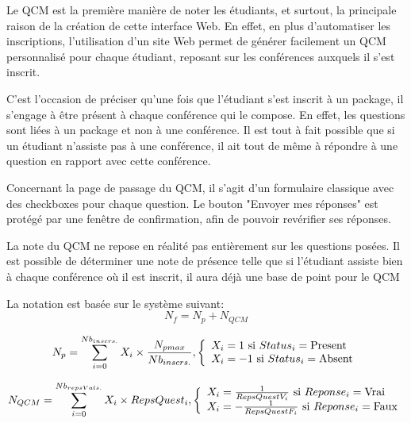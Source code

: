 Le QCM est la première manière de noter les étudiants, et surtout, la principale
raison de la création de cette interface Web. En effet, en plus d'automatiser les
inscriptions, l'utilisation d'un site Web permet de générer facilement un QCM
personnalisé pour chaque étudiant, reposant sur les conférences auxquels il s'est inscrit.

C'est l'occasion de préciser qu'une fois que l'étudiant s'est inscrit à un package,
il s'engage à être présent à chaque conférence qui le compose. En effet, les
questions sont liées à un package et non à une conférence.
Il est tout à fait possible que si un étudiant n'assiste pas à une conférence,
il ait tout de même à répondre à une question en rapport avec cette conférence.

Concernant la page de passage du QCM, il s'agit d'un formulaire classique avec des checkboxes pour chaque question.
Le bouton "Envoyer mes réponses" est protégé par une fenêtre de confirmation, afin de pouvoir revérifier ses réponses.

La note du QCM ne repose en réalité pas entièrement sur les questions posées.
Il est possible de déterminer une note de présence telle que si l'étudiant assiste
bien à chaque conférence où il est inscrit, il aura déjà une base de point pour le QCM
\newpage

La notation est basée sur le système suivant:
\begin{equation}N_{f} = N_{p} + N_{QCM}\end{equation}

\begin{equation}
    N_{p} = \sum_{i = 0}^{Nb_{inscrs.}} X_{i} \times \frac{N_{pmax}}{Nb_{inscrs.}} {,}
    \left\{
    \begin{array}{l l}
        X_{i} = 1 \text{ si }Status_{i} = \text{Present}\\
        X_{i} = -1\text{ si }Status_{i} = \text{Absent}\\
    \end{array}
    \right.
\end{equation}

\begin{equation}
    N_{QCM} = \sum_{i = 0}^{Nb_{repsVals.}} X_{i} \times RepsQuest_{i} {,}
    \left\{
    \begin{array}{l l}
        X_{i} = \frac{1}{RepsQuestV_{i}} \text{ si }Reponse_{i} = \text{Vrai}\\
        X_{i} = -\frac{1}{RepsQuestF_{i}} \text{ si }Reponse_{i} = \text{Faux}\\
    \end{array}
    \right.
\end{equation}

